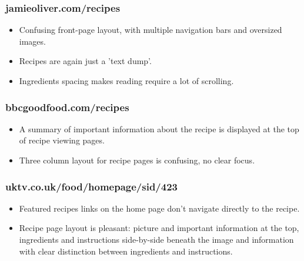 \documentclass{article}
\begin{document}
\subsubsection{jamieoliver.com/recipes}
\begin{itemize}
\item Confusing front-page layout, with multiple navigation bars and oversized images.
\item Recipes are again just a 'text dump'.
\item Ingredients spacing makes reading require a lot of scrolling.
\end{itemize}

\subsubsection{bbcgoodfood.com/recipes}
\begin{itemize}
\item A summary of important information about the recipe is displayed at the top of recipe viewing pages.
\item Three column layout for recipe pages is confusing, no clear focus.
\end{itemize}

\subsubsection{uktv.co.uk/food/homepage/sid/423}
\begin{itemize}
\item Featured recipes links on the home page don't navigate directly to the recipe.
\item Recipe page layout is pleasant: picture and important information at the top, ingredients and instructions side-by-side beneath the image and information with clear distinction between ingredients and instructions.
\end{itemize}
\end{document}
